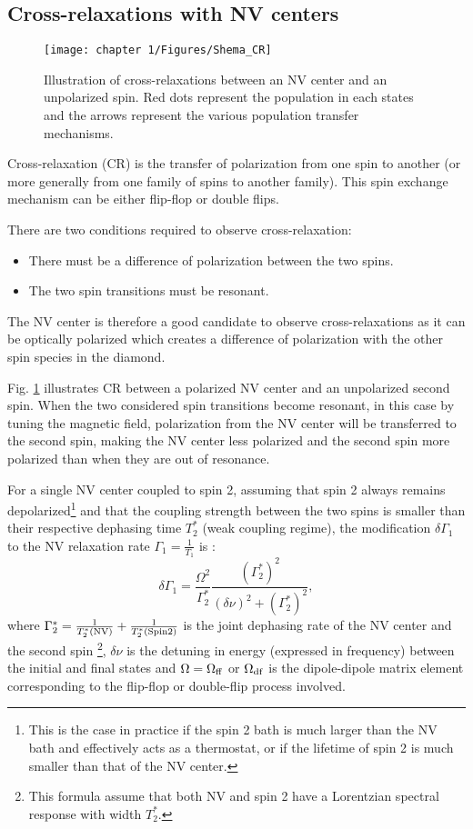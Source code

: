 \documentclass[a4paper, 11pt]{report}
\begin{document}
\subsection{Cross-relaxations with NV centers}
\label{Sec_CR}
\begin{figure}[h!]
\centering
\texttt{[image: chapter 1/Figures/Shema\_CR]}
\caption{Illustration of cross-relaxations between an NV center and an unpolarized spin. Red dots represent the population in each states and the arrows represent the various population transfer mechanisms.}
\label{CR_shema}
\end{figure}

Cross-relaxation (CR) is the transfer of polarization from one spin to another (or more generally from one family of spins to another family). This spin exchange mechanism can be either flip-flop or double flips.

There are two conditions required to observe cross-relaxation: 
\begin{itemize}
\item There must be a difference of polarization between the two spins.
\item The two spin transitions must be resonant.
\end{itemize}

The NV center is therefore a good candidate to observe cross-relaxations as it can be optically polarized which creates a difference of polarization with the other spin species in the diamond.

Fig. \ref{CR_shema} illustrates CR between a polarized NV center and an unpolarized second spin. When the two considered spin transitions become resonant, in this case by tuning the magnetic field, polarization from the NV center will be transferred to the second spin, making the NV center less polarized and the second spin more polarized than when they are out of resonance. 

For a single NV center coupled to spin 2, assuming that spin 2 always remains depolarized\footnote{This is the case in practice if the spin 2 bath is much larger than the NV bath and effectively acts as a thermostat, or if the lifetime of spin 2 is much smaller than that of the NV center.} and that the coupling strength between the two spins is smaller than their respective dephasing time $T_2^*$ (weak coupling regime), the modification $\delta \Gamma_1$ to the NV relaxation rate $\Gamma_1=\frac{1}{T_1}$ is \citep{hall2016detection}:
\begin{equation}
\delta \Gamma_1=\frac{\Omega^2}{\Gamma_2^*} \frac{(\Gamma_2^*)^2}{(\delta \nu)^2+(\Gamma_2^*)^2},
\label{delta gamma 1}
\end{equation}
where $\Gamma_2^*=\frac{1}{T_2^*(\rm NV)}+\frac{1}{T_2^*(\rm Spin 2)}$ is the joint dephasing rate of the NV center and the second spin \footnote{This formula assume that both NV and spin 2 have a Lorentzian spectral response with width $T_2^*$.}, $\delta \nu$ is the detuning in energy (expressed in frequency) between the initial and final states and $\Omega=\Omega_{\rm ff}$ or $\Omega_{\rm df}$ is the dipole-dipole matrix element corresponding to the flip-flop or double-flip process involved.
\end{document}
